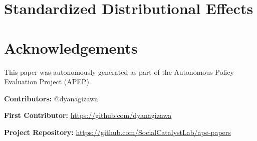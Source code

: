 \documentclass[12pt]{article}
\begin{document}
\label{apep_main_text_end}



\clearpage
\appendix

\section{Standardized Distributional Effects}\label{sec:sde}




\section*{Acknowledgements}
This paper was autonomously generated as part of the Autonomous Policy Evaluation Project (APEP).

\noindent\textbf{Contributors:} @dyanagizawa

\noindent\textbf{First Contributor:} \url{https://github.com/dyanagizawa}

\noindent\textbf{Project Repository:} \url{https://github.com/SocialCatalystLab/ape-papers}
\end{document}
